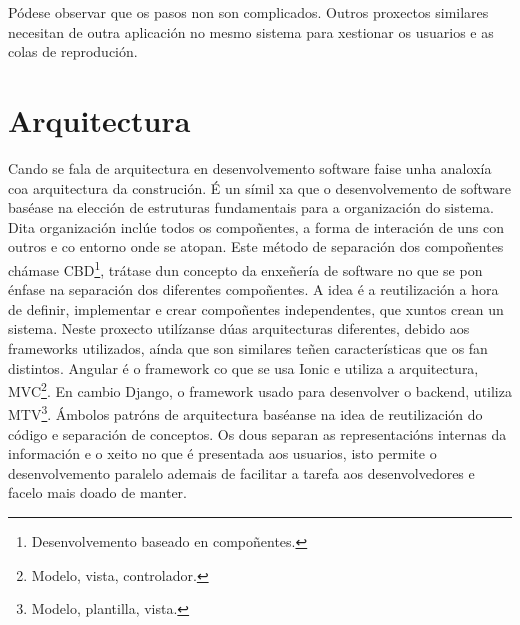 Pódese observar que os pasos non son complicados. Outros proxectos similares necesitan de outra aplicación no mesmo sistema para xestionar os usuarios e as colas de reprodución.

\section{Arquitectura}
\label{sec:arquitectura}
Cando se fala de arquitectura en desenvolvemento software faise unha analoxía coa arquitectura da construción. É un símil xa que o desenvolvemento de software baséase na elección de estruturas fundamentais para a organización do sistema. Dita organización inclúe todos os compoñentes, a forma de interación de uns con outros e co entorno onde se atopan. Este método de separación dos compoñentes chámase \acrlong{CBD}\footnote{Desenvolvemento baseado en compoñentes.}, trátase dun concepto da enxeñería de software no que se pon énfase na separación dos diferentes compoñentes. A idea é a reutilización a hora de definir, implementar e crear compoñentes independentes, que xuntos crean un sistema.\smallbreak
Neste proxecto utilízanse dúas arquitecturas diferentes, debido aos frameworks utilizados, aínda que son similares teñen características que os fan distintos. Angular é o framework co que se usa Ionic e utiliza a arquitectura, \acrfull{MVC}\footnote{Modelo, vista, controlador.}. En cambio Django, o framework usado para desenvolver o backend, utiliza \acrfull{MTV}\footnote{Modelo, plantilla, vista.}. Ámbolos patróns de arquitectura baséanse na idea de reutilización do código e separación de conceptos. Os dous separan as representacións internas da información e o xeito no que é presentada aos usuarios, isto permite o desenvolvemento paralelo ademais de facilitar a tarefa aos desenvolvedores e facelo mais doado de manter.

